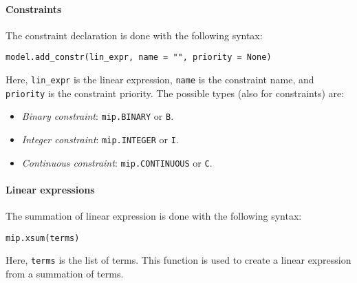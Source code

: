 \paragraph*{Constraints}
The constraint declaration is done with the following syntax: 
\begin{lstlisting}[style=Python]
model.add_constr(lin_expr, name = "", priority = None)
\end{lstlisting}
Here, \texttt{lin\_expr} is the linear expression, \texttt{name} is the constraint name, and \texttt{priority} is the constraint priority.
The possible types (also for constraints) are: 
\begin{itemize}
    \item \textit{Binary constraint}: \texttt{mip.BINARY} or \texttt{B}.
    \item \textit{Integer constraint}: \texttt{mip.INTEGER} or \texttt{I}.
    \item \textit{Continuous constraint}: \texttt{mip.CONTINUOUS} or \texttt{C}.
\end{itemize}

\paragraph*{Linear expressions}
The summation of linear expression is done with the following syntax: 
\begin{lstlisting}[style=Python]
mip.xsum(terms)
\end{lstlisting}
Here, \texttt{terms} is the list of terms. 
This function is used to create a linear expression from a summation of terms.